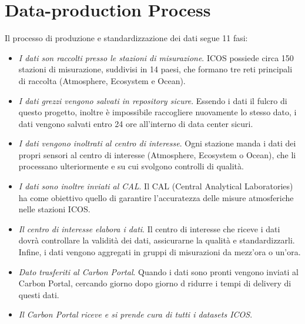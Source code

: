 \section{Data-production Process}
Il processo di produzione e standardizzazione dei dati segue 11 fasi:
\begin{itemize}
    \item \textit{I dati son raccolti presso le stazioni di misurazione}.
    ICOS possiede circa 150 stazioni di misurazione, suddivisi in 14 paesi,
    che formano tre reti principali di raccolta (Atmosphere, Ecosystem e Ocean).
    \item \textit{I dati grezzi vengono salvati in repository sicure}.
    Essendo i dati il fulcro di questo progetto, inoltre è impossibile raccogliere nuovamente
    lo stesso dato, i dati vengono salvati entro 24 ore all'interno di
    data center sicuri.
    \item \textit{I dati vengono inoltrati al centro di interesse}. Ogni stazione manda i dati dei propri sensori al centro di interesse
    (Atmosphere, Ecosystem o Ocean), che li processano ulteriormente e su cui svolgono controlli di qualità.
    \item \textit{I dati sono inoltre inviati al CAL}. Il CAL (Central Analytical Laboratories) ha come obiettivo quello di garantire
    l'accuratezza delle misure atmosferiche nelle stazioni ICOS.
    \item \textit{Il centro di interesse elabora i dati}. Il centro di interesse che riceve i dati dovrà controllare la validità dei dati, assicurarne la qualità e
    standardizzarli. Infine, i dati vengono aggregati in gruppi di misurazioni da mezz'ora o un'ora.
    \item \textit{Dato trasferiti al Carbon Portal}. Quando i dati sono pronti vengono inviati al Carbon Portal, cercando giorno dopo giorno d ridurre i tempi di delivery di questi dati.
    \item \textit{Il Carbon Portal riceve e si prende cura di tutti i datasets ICOS}.
\end{itemize}